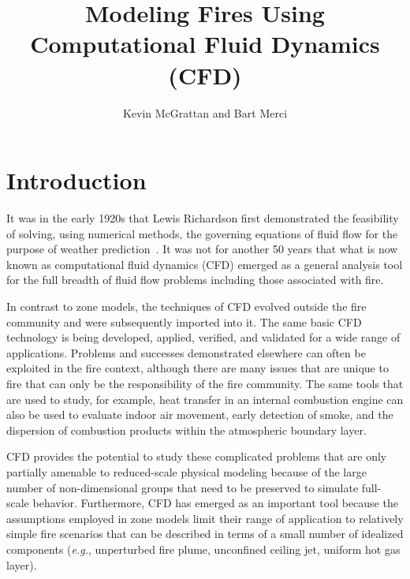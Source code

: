 \documentclass[graybox]{svmult}
\begin{document}
\title*{Modeling Fires Using Computational Fluid Dynamics (CFD)}

\author{Kevin McGrattan and Bart Merci}


\maketitle


\section{Introduction}

It was in the early 1920s that Lewis Richardson first demonstrated the feasibility of solving, using numerical methods, the governing equations of fluid flow for the purpose of weather prediction~\cite{Richardson}. It was not for another 50 years that what is now known as computational fluid dynamics (CFD) emerged as a general analysis tool for the full breadth of fluid flow problems including those associated with fire.

In contrast to zone models, the techniques of CFD evolved outside the fire community and were subsequently imported into it. The same basic CFD technology is being developed, applied, verified, and validated for a wide range of applications. Problems and successes demonstrated elsewhere can often be exploited in the fire context, although there are many issues that are unique to fire that can only be the responsibility of the fire community. The same tools that are used to study, for example, heat transfer in an internal combustion engine can also be used to evaluate indoor air movement, early detection of smoke, and the dispersion of combustion products within the atmospheric boundary layer.

CFD provides the potential to study these complicated problems that are only partially amenable to reduced-scale physical modeling because of the large number of non-dimensional groups that need to be preserved to simulate full-scale behavior. Furthermore, CFD has emerged as an important tool because the assumptions employed in zone models limit their range of application to relatively simple fire scenarios that can be described in terms of a small number of idealized components ({\em e.g.}, unperturbed fire plume, unconfined ceiling jet, uniform hot gas layer).
\end{document}

